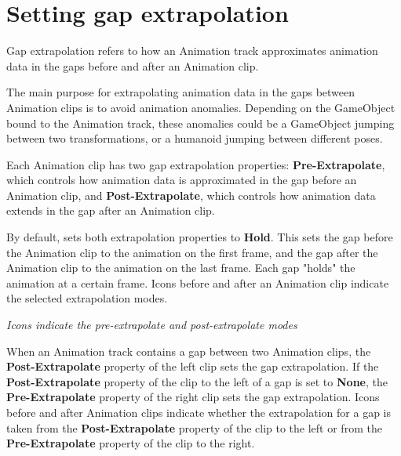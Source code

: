 \chapter{Setting gap extrapolation}
\hypertarget{md__hey_tea_9_2_library_2_package_cache_2com_8unity_8timeline_0d1_87_85_2_documentation_0i_2clp__gap__extrap}{}\label{md__hey_tea_9_2_library_2_package_cache_2com_8unity_8timeline_0d1_87_85_2_documentation_0i_2clp__gap__extrap}
\label{md__hey_tea_9_2_library_2_package_cache_2com_8unity_8timeline_0d1_87_85_2_documentation_0i_2clp__gap__extrap_autotoc_md4614}%
%
 Gap extrapolation refers to how an Animation track approximates animation data in the gaps before and after an Animation clip.

The main purpose for extrapolating animation data in the gaps between Animation clips is to avoid animation anomalies. Depending on the Game\+Object bound to the Animation track, these anomalies could be a Game\+Object jumping between two transformations, or a humanoid jumping between different poses.

Each Animation clip has two gap extrapolation properties\+: {\bfseries{Pre-\/\+Extrapolate}}, which controls how animation data is approximated in the gap before an Animation clip, and {\bfseries{Post-\/\+Extrapolate}}, which controls how animation data extends in the gap after an Animation clip.

By default,  sets both extrapolation properties to {\bfseries{Hold}}. This sets the gap before the Animation clip to the animation on the first frame, and the gap after the Animation clip to the animation on the last frame. Each gap "{}holds"{} the animation at a certain frame. Icons before and after an Animation clip indicate the selected extrapolation modes.



{\itshape Icons indicate the pre-\/extrapolate and post-\/extrapolate modes}

When an Animation track contains a gap between two Animation clips, the {\bfseries{Post-\/\+Extrapolate}} property of the left clip sets the gap extrapolation. If the {\bfseries{Post-\/\+Extrapolate}} property of the clip to the left of a gap is set to {\bfseries{None}}, the {\bfseries{Pre-\/\+Extrapolate}} property of the right clip sets the gap extrapolation. Icons before and after Animation clips indicate whether the extrapolation for a gap is taken from the {\bfseries{Post-\/\+Extrapolate}} property of the clip to the left or from the {\bfseries{Pre-\/\+Extrapolate}} property of the clip to the right.



